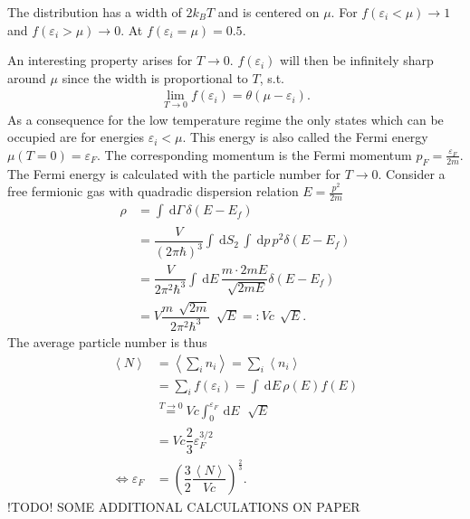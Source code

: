\documentclass[a4paper,10pt]{article}
\newcommand{\td}{\,\text{d}}
\numberwithin{equation}{section}
\begin{document}
\begin{multicols}{2}
The distribution has a width of $2k_BT$ and is centered on $\mu $.
For $f(\varepsilon _i<\mu )\rightarrow 1$ and $f(\varepsilon _i>\mu )\rightarrow 0$.
At $f(\varepsilon _i=\mu )=0.5$.

An interesting property arises for $T\rightarrow 0$.
$f(\varepsilon _i)$ will then be infinitely sharp around $\mu $ since the width is proportional to $T$, s.t.\ 
\begin{align} 
  \lim_{T\rightarrow 0}f(\varepsilon _i)=\theta (\mu -\varepsilon _i)
.\end{align}
As a consequence for the low temperature regime the only states which can be occupied are for energies $\varepsilon _i<\mu $.
This energy is also called the Fermi energy $\mu (T=0)=\varepsilon _F$.
The corresponding momentum is the Fermi momentum $p_F=\tfrac{\varepsilon _F}{2m}$.
The Fermi energy is calculated with the particle number for $T\rightarrow 0$.
Consider a free fermionic gas with quadradic dispersion relation $E=\tfrac{p^2}{2m}$
\begin{align} 
  \rho  &= \int_{}^{}\td \Gamma \,\delta \left(E-E_f\right)\\
        &= \dfrac{V}{(2\pi \hbar )^3}\int_{}^{}\td S_2\,\int_{}^{}\td p\,p^2\delta (E-E_f)\\
        &= \dfrac{V}{2\pi ^2\hbar ^3}\int_{}^{}\td E\,\dfrac{m\cdot 2mE}{\,\sqrt[]{2mE}}\delta (E-E_f)\\
        &= V\dfrac{m\,\sqrt[]{2m}}{2\pi ^2\hbar ^3}\,\sqrt[]{E} =: Vc \,\sqrt[]{E}
.\end{align} 
The average particle number is thus
\begin{align} 
  \left\langle N\right\rangle &= \left\langle \sum_{i}^{}n_i\right\rangle =\sum_{i}^{}\left\langle n_i\right\rangle \\
                              &= \sum_{i}^{}f(\varepsilon _i) = \int_{}^{}\td E\,\rho (E)f(E)\\
                              &\stackrel{T\rightarrow 0}{=} Vc\int_{0}^{\varepsilon _F}\td E\,\,\sqrt[]{E}\\
                              &= Vc \dfrac{2}{3}\varepsilon _F^{3/2}\\
  \Leftrightarrow \varepsilon _F &= \left(\dfrac{3}{2}\dfrac{\left\langle N\right\rangle }{Vc}\right)^{\tfrac{2}{3}}
.\end{align} 
!TODO! SOME ADDITIONAL CALCULATIONS ON PAPER


\end{multicols}
\end{document}
